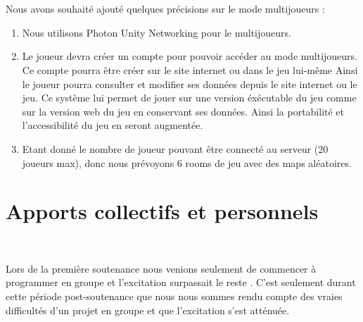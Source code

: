 \documentclass[titlepage, 13px, a4paper]{article}
\begin{document}
\paragraph{} \hspace{0pt} \\
Nous avons souhaité ajouté quelques précisions sur le mode multijoueurs :
\\
{\begin{enumerate}
	\item Nous utilisons Photon Unity Networking pour le multijoueurs.
		\\
	\item Le joueur devra créer un compte pour pouvoir accéder au mode multijoueurs.
			Ce compte pourra être créer sur le site internet ou dans le jeu lui-même
			Ainsi le joueur pourra consulter et modifier ses données depuis le site internet ou le jeu.
			Ce système lui permet de jouer sur une version éxécutable du jeu comme sur la version web du jeu en conservant ses données.
			Ainsi la portabilité et l'accessibilité du jeu en seront augmentée.
		\\
	\item Etant donné le nombre de joueur pouvant être connecté au serveur (20 joueurs max), donc nous prévoyons 6 rooms de jeu avec des maps aléatoires.
		\\
\end{enumerate}}



\part{Apports collectifs et personnels}
\paragraph{} \hspace{0pt} \\
Lors de la première soutenance nous venions seulement de commencer à  programmer en groupe et l’excitation surpassait le reste . 
C'est seulement durant cette période post-soutenance que nous
nous sommes rendu compte des vraies difficultés d'un projet en groupe et que l'excitation s’est atténuée. \\
\end{document}
